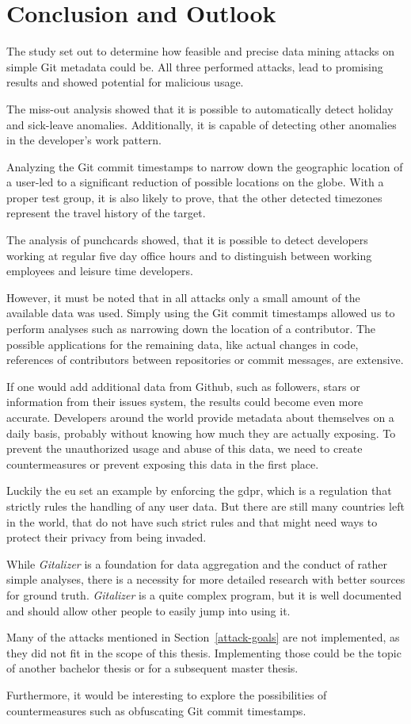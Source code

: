 \chapter{Conclusion and Outlook}

The study set out to determine how feasible and precise data mining attacks on simple Git metadata could be.
All three performed attacks, lead to promising results and showed potential for malicious usage.

The miss-out analysis showed that it is possible to automatically detect holiday and sick-leave anomalies.
Additionally, it is capable of detecting other anomalies in the developer's work pattern.

Analyzing the Git commit timestamps to narrow down the geographic location of a user-led to a significant reduction of possible locations on the globe.
With a proper test group, it is also likely to prove, that the other detected timezones represent the travel history of the target.

The analysis of punchcards showed, that it is possible to detect developers working at regular five day office hours and to distinguish between working employees and leisure time developers.

However, it must be noted that in all attacks only a small amount of the available data was used.
Simply using the Git commit timestamps allowed us to perform analyses such as narrowing down the location of a contributor.
The possible applications for the remaining data, like actual changes in code, references of contributors between repositories or commit messages, are extensive.

If one would add additional data from Github, such as followers, stars or information from their issues system, the results could become even more accurate.
Developers around the world provide metadata about themselves on a daily basis, probably without knowing how much they are actually exposing.
To prevent the unauthorized usage and abuse of this data, we need to create countermeasures or prevent exposing this data in the first place.

Luckily the \ac{eu} set an example by enforcing the \ac{gdpr}, which is a regulation that strictly rules the handling of any user data.
But there are still many countries left in the world, that do not have such strict rules and that might need ways to protect their privacy from being invaded.

While \emph{Gitalizer} is a foundation for data aggregation and the conduct of rather simple analyses, there is a necessity for more detailed research with better sources for ground truth.
\emph{Gitalizer} is a quite complex program, but it is well documented and should allow other people to easily jump into using it.

Many of the attacks mentioned in Section~\ref{attack-goals} are not implemented, as they did not fit in the scope of this thesis.
Implementing those could be the topic of another bachelor thesis or for a subsequent master thesis.

Furthermore, it would be interesting to explore the possibilities of countermeasures such as obfuscating Git commit timestamps.
